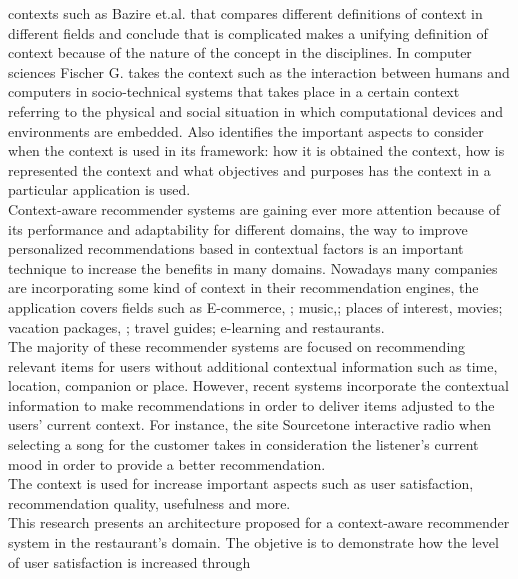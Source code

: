 contexts such as Bazire et.al.\cite{bazire2005understanding} that compares 
different definitions of context in different fields and conclude that is
complicated makes a unifying definition of context because of the
nature of the concept in the disciplines. In computer sciences Fischer
G.\cite{fischer2012context} takes the context such as the interaction
between humans and computers in socio-technical systems that takes
place in a certain context referring to the physical and social
situation in which computational devices and environments are
embedded. Also identifies the important aspects to consider when the
context is used in its framework: how it is obtained the context, how
is represented the context and what objectives and purposes has the
context in a particular application is used. \\
Context-aware recommender systems are gaining ever more attention
because of its performance and adaptability for different domains, the
way to improve personalized recommendations based in contextual
factors is an important technique to increase the benefits in many
domains. Nowadays many companies are incorporating some kind of
context in their recommendation engines, the application covers fields
such as E-commerce\cite{schafer1999recommender}, \cite{bulander2005enabling};
music\cite{ricci2012context},\cite{baltrunas2011incarmusic}; 
places of interest\cite{baltrunas2012context},
movies\cite{eyjolfsdottir2010moviegen}; vacation packages\cite{liu2011personalized},
\cite{liu2014cocktail}; travel guides\cite{savage2012m}; e-learning\cite{ortigosa2010entornos} and restaurants\cite{chu2013chinese}.\\  
The majority of these recommender systems are focused on 
recommending relevant items for users without
additional contextual information such as time, location,
companion or place. However, recent systems incorporate the contextual
information to make recommendations in order to deliver items adjusted
to the users' current context. For instance, the site Sourcetone
interactive radio \cite{huq2010automated} when selecting a song for
the customer takes in consideration the listener's current mood in
order to provide a better recommendation. \\ The context is used for
increase important aspects such as user satisfaction, recommendation
quality, usefulness and more.\\
This research presents an architecture proposed for a context-aware
recommender system in the restaurant's domain. The objetive is to
demonstrate how the level of user satisfaction is increased through
